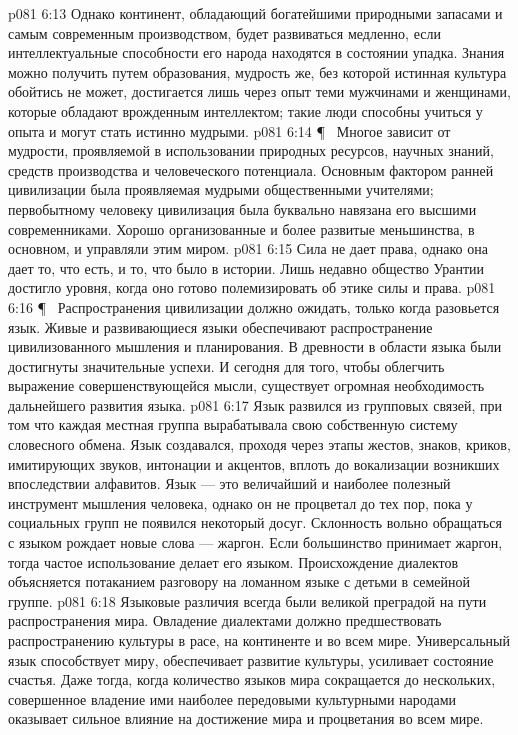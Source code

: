 \vs p081 6:13 Однако континент, обладающий богатейшими природными запасами и самым современным производством, будет развиваться медленно, если интеллектуальные способности его народа находятся в состоянии упадка. Знания можно получить путем образования, мудрость же, без которой истинная культура обойтись не может, достигается лишь через опыт теми мужчинами и женщинами, которые обладают врожденным интеллектом; такие люди способны учиться у опыта и могут стать истинно мудрыми.
\vs p081 6:14 \P\ \bibnobreakspace {} Многое зависит от мудрости, проявляемой в использовании природных ресурсов, научных знаний, средств производства и человеческого потенциала. Основным фактором ранней цивилизации была  проявляемая мудрыми общественными учителями; первобытному человеку цивилизация была буквально навязана его высшими современниками. Хорошо организованные и более развитые меньшинства, в основном, и управляли этим миром.
\vs p081 6:15 Сила не дает права, однако она дает то, что есть, и то, что было в истории. Лишь недавно общество Урантии достигло уровня, когда оно готово полемизировать об этике силы и права.
\vs p081 6:16 \P\ \bibnobreakspace {} Распространения цивилизации должно ожидать, только когда разовьется язык. Живые и развивающиеся языки обеспечивают распространение цивилизованного мышления и планирования. В древности в области языка были достигнуты значительные успехи. И сегодня для того, чтобы облегчить выражение совершенствующейся мысли, существует огромная необходимость дальнейшего развития языка.
\vs p081 6:17 Язык развился из групповых связей, при том что каждая местная группа вырабатывала свою собственную систему словесного обмена. Язык создавался, проходя через этапы жестов, знаков, криков, имитирующих звуков, интонации и акцентов, вплоть до вокализации возникших впоследствии алфавитов. Язык --- это величайший и наиболее полезный инструмент мышления человека, однако он не процветал до тех пор, пока у социальных групп не появился некоторый досуг. Склонность вольно обращаться с языком рождает новые слова --- жаргон. Если большинство принимает жаргон, тогда частое использование делает его языком. Происхождение диалектов объясняется потаканием разговору на ломанном языке с детьми в семейной группе.
\vs p081 6:18 Языковые различия всегда были великой преградой на пути распространения мира. Овладение диалектами должно предшествовать распространению культуры в расе, на континенте и во всем мире. Универсальный язык способствует миру, обеспечивает развитие культуры, усиливает состояние счастья. Даже тогда, когда количество языков мира сокращается до нескольких, совершенное владение ими наиболее передовыми культурными народами оказывает сильное влияние на достижение мира и процветания во всем мире.
